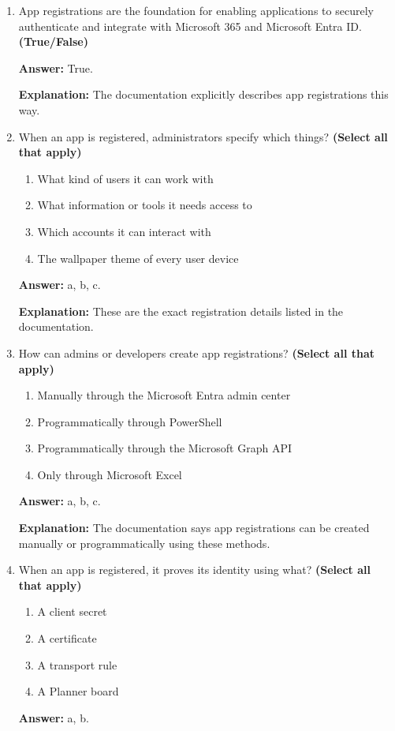 \documentclass[10pt]{article}
\begin{document}
\begin{enumerate}[leftmargin=*]
\textbf{Explanation:} These are the exact secure-management outcomes listed in the documentation.

\item App registrations are the foundation for enabling applications to securely authenticate and integrate with Microsoft 365 and Microsoft Entra ID. \textbf{(True/False)}

\textbf{Answer:} True.

\textbf{Explanation:} The documentation explicitly describes app registrations this way.

\item When an app is registered, administrators specify which things? \textbf{(Select all that apply)}
\begin{enumerate}[label=\alph*., leftmargin=1.5em]
\item What kind of users it can work with
\item What information or tools it needs access to
\item Which accounts it can interact with
\item The wallpaper theme of every user device
\end{enumerate}
\textbf{Answer:} a, b, c.

\textbf{Explanation:} These are the exact registration details listed in the documentation.

\item How can admins or developers create app registrations? \textbf{(Select all that apply)}
\begin{enumerate}[label=\alph*., leftmargin=1.5em]
\item Manually through the Microsoft Entra admin center
\item Programmatically through PowerShell
\item Programmatically through the Microsoft Graph API
\item Only through Microsoft Excel
\end{enumerate}
\textbf{Answer:} a, b, c.

\textbf{Explanation:} The documentation says app registrations can be created manually or programmatically using these methods.

\item When an app is registered, it proves its identity using what? \textbf{(Select all that apply)}
\begin{enumerate}[label=\alph*., leftmargin=1.5em]
\item A client secret
\item A certificate
\item A transport rule
\item A Planner board
\end{enumerate}
\textbf{Answer:} a, b.


\end{enumerate}
\end{document}
